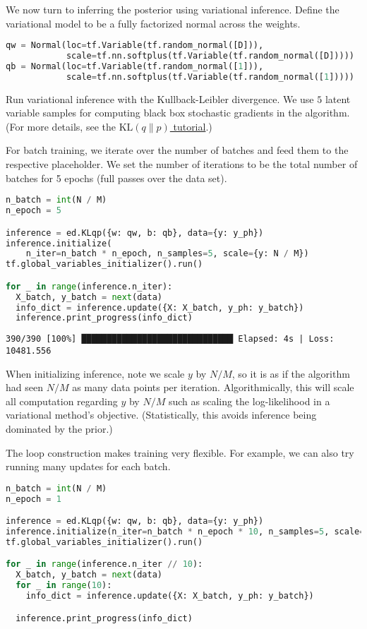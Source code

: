 We now turn to inferring the posterior using variational inference.
Define the variational model to be a fully factorized normal across
the weights.
\begin{lstlisting}[language=Python]
qw = Normal(loc=tf.Variable(tf.random_normal([D])),
            scale=tf.nn.softplus(tf.Variable(tf.random_normal([D]))))
qb = Normal(loc=tf.Variable(tf.random_normal([1])),
            scale=tf.nn.softplus(tf.Variable(tf.random_normal([1]))))
\end{lstlisting}

Run variational inference with the Kullback-Leibler divergence.
We use $5$ latent variable samples for computing
black box stochastic gradients in the algorithm.
(For more details, see the
\href{/tutorials/klqp}{$\text{KL}(q\|p)$ tutorial}.)

For batch training, we iterate over the number of batches and
feed them to the respective placeholder. We set the number of
iterations to be the total number of batches for 5 epochs
(full passes over the data set).

\begin{lstlisting}[language=Python]
n_batch = int(N / M)
n_epoch = 5

inference = ed.KLqp({w: qw, b: qb}, data={y: y_ph})
inference.initialize(
    n_iter=n_batch * n_epoch, n_samples=5, scale={y: N / M})
tf.global_variables_initializer().run()

for _ in range(inference.n_iter):
  X_batch, y_batch = next(data)
  info_dict = inference.update({X: X_batch, y_ph: y_batch})
  inference.print_progress(info_dict)
\end{lstlisting}

\begin{lstlisting}
390/390 [100%] ██████████████████████████████ Elapsed: 4s | Loss: 10481.556
\end{lstlisting}

When initializing inference, note we scale $y$ by $N/M$, so it is as if the
algorithm had seen $N/M$ as many data points per iteration.
Algorithmically, this will scale all computation regarding $y$ by
$N/M$ such as scaling the log-likelihood in a variational method's
objective. (Statistically, this avoids inference being dominated by the prior.)

The loop construction makes training very flexible. For example, we
can also try running many updates for each batch.

\begin{lstlisting}[language=Python]
n_batch = int(N / M)
n_epoch = 1

inference = ed.KLqp({w: qw, b: qb}, data={y: y_ph})
inference.initialize(n_iter=n_batch * n_epoch * 10, n_samples=5, scale={y: N / M})
tf.global_variables_initializer().run()

for _ in range(inference.n_iter // 10):
  X_batch, y_batch = next(data)
  for _ in range(10):
    info_dict = inference.update({X: X_batch, y_ph: y_batch})

  inference.print_progress(info_dict)
\end{lstlisting}

